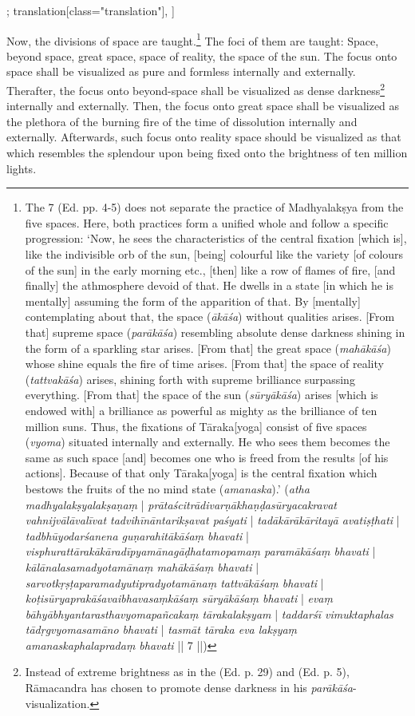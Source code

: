 \begin{alignment}[
  texts=edition[class="edition"];
  translation[class="translation"],
  ]
\begin{translation}
\begin{tlate}[p28_01]
 Now, the divisions of space are taught.\footnote{The  7 (Ed. pp. 4-5) does not separate the practice of Madhyalakṣya from the five spaces. Here, both practices form a unified whole and follow a specific progression: `Now, he sees the characteristics of the central fixation [which is], like the indivisible orb of the sun, [being] colourful like the variety [of colours of the sun] in the early morning etc., [then] like a row of flames of fire, [and finally] the athmosphere devoid of that. He dwells in a state [in which he is mentally] assuming the form of the apparition of that. By [mentally] contemplating about that, the space (\textit{ākāśa}) without qualities arises. [From that] supreme space (\textit{parākāśa}) resembling absolute dense darkness shining in the form of a sparkling star arises. [From that] the great space (\textit{mahākāśa}) whose shine equals the fire of time arises. [From that] the space of reality (\textit{tattvakāśa}) arises, shining forth with supreme brilliance surpassing everything. [From that] the space of the sun (\textit{sūryākāśa}) arises [which is endowed with] a brilliance as powerful as mighty as the brilliance of ten million suns. Thus, the fixations of Tāraka[yoga] consist of five spaces (\textit{vyoma}) situated internally and externally. He who sees them becomes the same as such space [and] becomes one who is freed from the results [of his actions]. Because of that only Tāraka[yoga] is the central fixation which bestows the fruits of the no mind state (\textit{amanaska}).' (\textit{atha madhyalakṣyalakṣaṇaṃ} | \textit{prātaścitrādivarṇākhaṇḍasūryacakravat vahnijvālāvalīvat tadvihīnāntarikṣavat paśyati} | \textit{tadākārākāritayā avatiṣṭhati} | \textit{tadbhūyodarśanena guṇarahitākāśaṃ bhavati} | \textit{visphurattārakākāradīpyamānagāḍhatamopamaṃ paramākāśaṃ bhavati} | \textit{kālānalasamadyotamānaṃ mahākāśaṃ bhavati} | \textit{sarvotkṛṣṭaparamadyutipradyotamānaṃ tattvākāśaṃ bhavati} | \textit{koṭisūryaprakāśavaibhavasaṃkāśaṃ sūryākāśaṃ bhavati} | \textit{evaṃ bāhyābhyantarasthavyomapañcakaṃ tārakalakṣyam} | \textit{taddarśī vimuktaphalas tādṛgvyomasamāno bhavati} | \textit{tasmāt tāraka eva lakṣyaṃ amanaskaphalapradaṃ bhavati} || 7 ||)}
 The foci of them are taught: Space, beyond space, great space, space of reality, the space of the sun. The focus onto space shall be visualized as pure and formless internally and externally. Therafter, the focus onto beyond-space shall be visualized as dense darkness\footnote{Instead of extreme brightness as in the  (Ed. p. 29) and  (Ed. p. 5), Rāmacandra has chosen to promote dense darkness in his \textit{parākāśa}-visualization.} internally and externally. Then, the focus onto great space shall be visualized as the plethora of the burning fire of the time of dissolution internally and externally. Afterwards, such focus onto reality space should be visualized as that which resembles the splendour upon being fixed onto the brightness of ten million lights.
 \flushpage 
\end{tlate}
  \end{translation}
\end{alignment}
